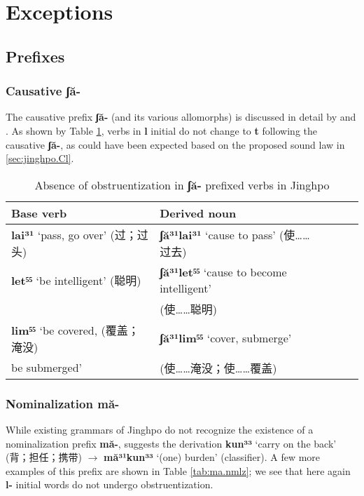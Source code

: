 \documentclass[oneside,a4paper,11pt]{article}
\newcommand{\ipa}[1]{{\phon\textbf{#1}}}
\newcommand{\zh}[1]{{\cn #1}}
\begin{document}
\section{Exceptions}

\subsection{Prefixes}

\subsubsection{Causative \ipa{ʃă-}}
The causative prefix \ipa{ʃă-} (and its various allomorphs) is discussed in detail by \citet[72-3]{dai90yufa} and \citet[88-90]{kurabe16jinghpo}. As shown by Table \ref{tab:sha.caus}, verbs in \ipa{l} initial do not change to \ipa{t} following the causative \ipa{ʃă-}, as could have been expected based on the proposed sound law in \ref{sec:jinghpo.Cl}.

\begin{table}[H]
\caption{Absence of obstruentization in \ipa{ʃă-} prefixed verbs in Jinghpo} \centering \label{tab:sha.caus} 
\begin{tabular}{lllll}
\toprule
Base verb & Derived noun \\
\midrule
\ipa{lai³¹} `pass, go over' (\zh{过；过头}) & \ipa{ʃă³¹lai³¹} `cause to pass' (\zh{使……过去}) \\
\ipa{let⁵⁵} `be intelligent' (\zh{聪明}) & \ipa{ʃă³¹let⁵⁵} `cause to become intelligent' \\
&(\zh{使……聪明}) \\
\ipa{lim⁵⁵} `be covered,  (\zh{覆盖；淹没}) & \ipa{ʃă³¹lim⁵⁵} `cover, submerge'  \\
be submerged'& (\zh{使……淹没；使……覆盖})\\
\bottomrule
\end{tabular}
\end{table}

\subsubsection{Nominalization \ipa{mă-}}
While existing grammars of Jinghpo do not recognize the existence of a nominalization prefix \ipa{mă-}, \citet[115]{dai90yufa} suggests the derivation \ipa{kun³³} `carry on the back' (\zh{背；担任；携带}) $\rightarrow$ \ipa{mă³¹kun³³} `(one) burden' (classifier). A few more examples of this prefix are shown in Table \ref{tab:ma.nmlz}; we see that here again \ipa{l-} initial words do not undergo obstruentization.
\end{document}
